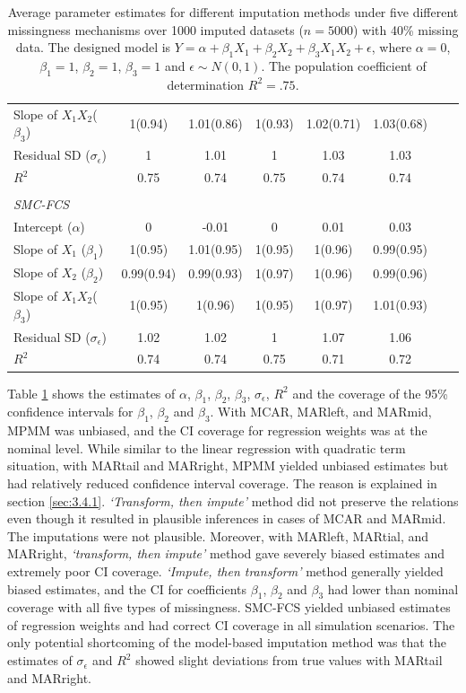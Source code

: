 \begin{table}[ht!]
{\begin{tabular}{lcccccrl}
				Slope of $X_1X_2$($\beta_3$)     &1(0.94) &1.01(0.86)   &1(0.93) &1.02(0.71)  &1.03(0.68)\\
				Residual SD ($\sigma_\epsilon$) 	&1		&1.01		&1		&1.03	&1.03\\	
				$R^2$						&0.75	&0.74	&0.75	&0.74	&0.74\\\\
				\textit{SMC-FCS}	&&&&&\\
				Intercept ($\alpha$)				&0	&-0.01	&0	&0.01	&0.03\\
				Slope of $X_1$ ($\beta_1$)			&1(0.95)	&1.01(0.95)	&1(0.95)	&1(0.96)	&0.99(0.95)\\
				Slope of $X_2$ ($\beta_2$)		&0.99(0.94)	&0.99(0.93)	&1(0.97)	&1(0.96)	&0.99(0.96)\\
				Slope of $X_1X_2$($\beta_3$)    &1(0.95)  &1(0.96)  &1(0.95)   &1(0.97)  &1.01(0.93)\\
				Residual SD ($\sigma_\epsilon$) 	&1.02	&1.02	&1	&1.07	&1.06\\
				$R^2$						&0.74	&0.74	&0.75		&0.71	&0.72\\\hline
			\end{tabular}
		}
		\caption{Average parameter estimates for different imputation methods under five different missingness mechanisms over 1000 imputed datasets ($n=5000$) with 40\% missing data. The designed model is $Y = \alpha+ \beta_1X_1 +  \beta_2X_2 + \beta_3X_1X_2 + \epsilon$, where $\alpha=0$, $\beta_1=1$, $\beta_2=1$, $\beta_3=1$ and $\epsilon \sim N (0,1)$. The population coefficient of determination $R^2=.75$.}
		\label{tab3_3}
		
	\end{table}
	
	Table \ref{tab3_3} shows the estimates of $\alpha$, $\beta_1$, $\beta_2$, $\beta_3$, $\sigma_\epsilon$, $R^2$ and the coverage of the 95\% confidence intervals for $\beta_1$, $\beta_2$ and $\beta_3$. With MCAR, MARleft, and MARmid, MPMM was unbiased, and the CI coverage for regression weights was at the nominal level. While similar to the linear regression with quadratic term situation, with MARtail and MARright, MPMM yielded unbiased estimates but had relatively reduced confidence interval coverage. The reason is explained in section \ref{sec:3.4.1}. \emph{`Transform, then impute'} method did not preserve the relations even though it resulted in plausible inferences in cases of MCAR and MARmid. The imputations were not plausible. Moreover, with MARleft, MARtial, and MARright, \emph{`transform, then impute'} method gave severely biased estimates and extremely poor CI coverage. \emph{`Impute, then transform'} method generally yielded biased estimates, and the CI for coefficients $\beta_1$, $\beta_2$ and $\beta_3$ had lower than nominal coverage with all five types of missingness. SMC-FCS yielded unbiased estimates of regression weights and had correct CI coverage in all simulation scenarios. The only potential shortcoming of the model-based imputation method was that the estimates of $\sigma_\epsilon$ and $R^2$ showed slight deviations from true values with MARtail and MARright.  
	
